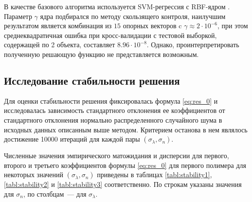 \documentclass[12pt,a4paper]{article}
\begin{document}
В качестве базового алгоритма используется SVM-регрессия с RBF-ядром \cite{Vapnik79}.
Параметр $\gamma$ ядра подбирался по методу скользящего контроля, наилучшим результатом является
комбинация из $15$ опорных векторов c $\gamma \approx 2 \cdot 10^{-6}$, при этом
среднеквадратичная ошибка при кросс-валидации с тестовой выборкой, содержащей по 2
объекта, составляет $8.96 \cdot 10^{-8}$. Однако, проинтерпретировать полученную
решающую функцию не представляется возможным.

\subsection{Исследование стабильности решения}

Для оценки стабильности решения фиксировалась формула \eqref{eq:res_0} и исследовалась
зависимость стандартного отклонения ее коэффициентов от стандартного отклонения
нормально распределенного случайного шума в исходных данных описанным выше методом.
Критерием останова в нем являлось достижение 10000 итераций для каждой пары
$(\sigma_{\lambda}, \sigma_n)$.

Численные значения эмпирического матожидания и дисперсии для первого, второго и третьего
коэффициентов формулы \eqref{eq:res_0} для первого полимера для некоторых значений
$(\sigma_{\lambda}, \sigma_n)$ приведены в таблицах \ref{tabl:stability1},
\ref{tabl:stability2} и \ref{tabl:stability3} соответственно. По строкам указаны значения
для $\sigma_n$, по столбцам~--- для $\sigma_{\lambda}$.
\end{document}
